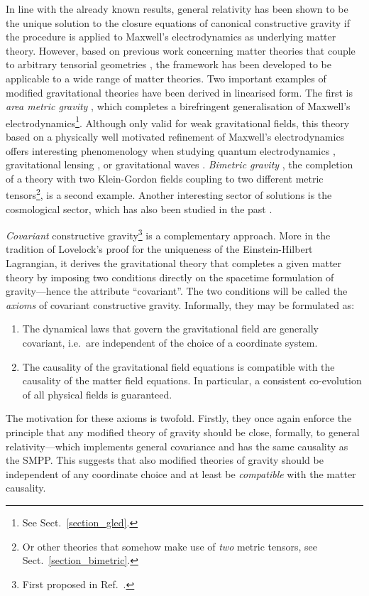 In line with the already known results, general relativity has been shown to be the unique solution to the closure equations of canonical constructive gravity if the procedure is applied to Maxwell's electrodynamics as underlying matter theory. \cite{Witte_2014} However, based on previous work concerning matter theories that couple to arbitrary tensorial geometries \cite{R_tzel_2011,Rivera_2012}, the framework has been developed to be applicable to a wide range of matter theories. Two important examples of modified gravitational theories have been derived in linearised form. The first is \emph{area metric gravity} \cite{Alex_2020_2}, which completes a birefringent generalisation of Maxwell's electrodynamics\footnote{See Sect.~\ref{section_gled}.}. Although only valid for weak gravitational fields, this theory based on a physically well motivated refinement of Maxwell's electrodynamics offers interesting phenomenology when studying quantum electrodynamics \cite{GrosseHolz_2017}, gravitational lensing \cite{Schuller_2017}, or gravitational waves \cite{Alex_2019}. \emph{Bimetric gravity} \cite{Wierzba_2018,Beier_2018}, the completion of a theory with two Klein-Gordon fields coupling to two different metric tensors\footnote{Or other theories that somehow make use of \emph{two} metric tensors, see Sect.~\ref{section_bimetric}.}, is a second example. Another interesting sector of solutions is the cosmological sector, which has also been studied in the past \cite{Duell_2020}.

\emph{Covariant} constructive gravity\footnote{First proposed in Ref.\ \cite{Alex_2020}.} is a complementary approach. More in the tradition of Lovelock's proof \cite{Lovelock_1969,Lovelock_1971,Lovelock_1972} for the uniqueness of the Einstein-Hilbert Lagrangian, it derives the gravitational theory that completes a given matter theory by imposing two conditions directly on the spacetime formulation of gravity---hence the attribute ``covariant''. The two conditions will be called the \emph{axioms} of covariant constructive gravity. Informally, they may be formulated as:
\begin{enumerate}
  \item The dynamical laws that govern the gravitational field are generally covariant, i.e.\ are independent of the choice of a coordinate system.
  \item The causality of the gravitational field equations is compatible with the causality of the matter field equations. In particular, a consistent co-evolution of all physical fields is guaranteed.
\end{enumerate}
The motivation for these axioms is twofold. Firstly, they once again enforce the principle that any modified theory of gravity should be close, formally, to general relativity---which implements general covariance and has the same causality as the SMPP\@. This suggests that also modified theories of gravity should be independent of any coordinate choice and at least be \emph{compatible} with the matter causality.

